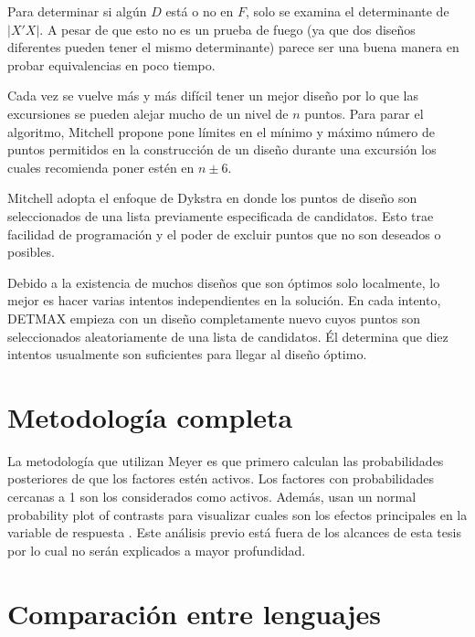 Para determinar si algún $D$ está o no en $F$, solo se examina el determinante de $|X'X|$. A pesar de que esto no es un prueba de fuego (ya que dos diseños diferentes pueden tener el mismo determinante) parece ser una buena manera en probar equivalencias en poco tiempo. 

Cada vez se vuelve más y más difícil tener un mejor diseño por lo que las excursiones se pueden alejar mucho de un nivel de $n$ puntos. Para parar el algoritmo, Mitchell propone pone límites en el mínimo y máximo número de puntos permitidos en la construcción de un diseño durante una excursión los cuales recomienda poner estén en $n \pm 6$. 

Mitchell adopta el enfoque de Dykstra  en donde los puntos de diseño son seleccionados de una lista previamente especificada de candidatos. Esto trae facilidad de programación y el poder de excluir puntos que no son deseados o posibles. 

Debido a la existencia de muchos diseños que son óptimos solo localmente, lo mejor es hacer varias intentos independientes en la solución. En cada intento, DETMAX empieza con un diseño completamente nuevo cuyos puntos son seleccionados aleatoriamente de una lista de candidatos. Él determina que diez intentos usualmente son suficientes para llegar al diseño óptimo. 




\section{Metodología completa}

La metodología que utilizan Meyer  es que primero calculan las probabilidades posteriores de que los factores estén activos. Los factores con probabilidades cercanas a 1 son los considerados como activos. Además, usan un normal probability plot of contrasts para visualizar cuales son los efectos principales en la variable de respuesta . Este análisis previo está fuera de los alcances de esta tesis por lo cual no serán explicados a mayor profundidad. 


\section{Comparación entre lenguajes}

